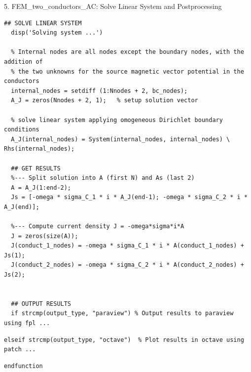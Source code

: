 \documentclass[aspectratio=54,xcolor=dvipsnames]{beamer}
\begin{document}
\begin{frame}[fragile]{5. FEM\_two\_conductors\_AC: Solve Linear System and Postprocessing}
\scriptsize
\begin{lstlisting}[firstnumber=100]
  ## SOLVE LINEAR SYSTEM
  disp('Solving system ...')

  % Internal nodes are all nodes except the boundary nodes, with the addition of
  % the two unknowns for the source magnetic vector potential in the conductors
  internal_nodes = setdiff (1:Nnodes + 2, bc_nodes);
  A_J = zeros(Nnodes + 2, 1);   % setup solution vector

  % solve linear system applying omogeneous Dirichlet boundary conditions
  A_J(internal_nodes) = System(internal_nodes, internal_nodes) \ Rhs(internal_nodes);

  ## GET RESULTS
  %--- Split solution into A (first N) and As (last 2)
  A = A_J(1:end-2);
  Js = [-omega * sigma_C_1 * i * A_J(end-1); -omega * sigma_C_2 * i * A_J(end)];

  %--- Compute current density J = -omega*sigma*i*A
  J = zeros(size(A));
  J(conduct_1_nodes) = -omega * sigma_C_1 * i * A(conduct_1_nodes) + Js(1);
  J(conduct_2_nodes) = -omega * sigma_C_2 * i * A(conduct_2_nodes) + Js(2);
  

  ## OUTPUT RESULTS
  if strcmp(output_type, "paraview") % Output results to paraview using fpl ...

\end{lstlisting}
\begin{lstlisting}[firstnumber=144]
  elseif strcmp(output_type, "octave")  % Plot results in octave using patch ...
\end{lstlisting}
\begin{lstlisting}[firstnumber=171]
endfunction
\end{lstlisting}
\end{frame}
\end{document}
